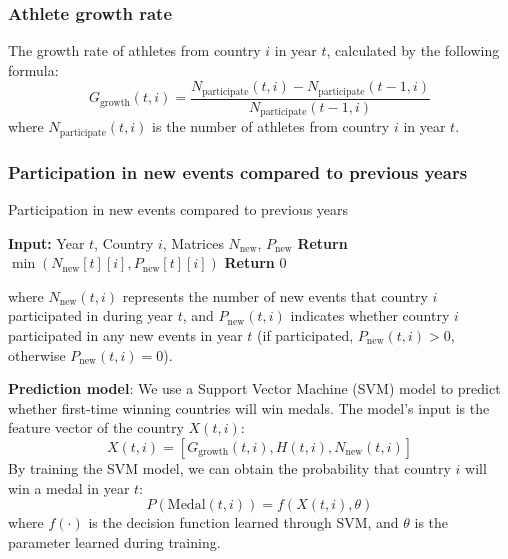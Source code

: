 \documentclass{mcmthesis}
\begin{document}
\subsubsection{Athlete growth rate}
The growth rate of athletes from country $i$ in year $t$, calculated by the following formula:
\[
G_{\text{growth}}(t,i) = \frac{N_{\text{participate}}(t,i) - N_{\text{participate}}(t-1,i)}{N_{\text{participate}}(t-1,i)}
\]
where $N_{\text{participate}}(t,i)$ is the number of athletes from country $i$ in year $t$.


\subsubsection{Participation in new events compared to previous years} 
\begin{algorithm}
	\caption{Participation in new events compared to previous years}
	\begin{algorithmic}[1]
		\State \textbf{Input:} Year \( t \), Country \( i \), Matrices \( N_{\text{new}} \), \( P_{\text{new}} \)
		\State \textbf{Return} $\min(N_{\text{new}}[t][i], P_{\text{new}}[t][i])$
		\EndIf
		\EndFor
		\State \textbf{Return} 0
	\end{algorithmic}
\end{algorithm}

where \( N_{\text{new}}(t,i) \) represents the number of new events that country \( i \) participated in during year \( t \), and \( P_{\text{new}}(t,i) \) indicates whether country \( i \) participated in any new events in year \( t \) (if participated, \( P_{\text{new}}(t,i) > 0 \), otherwise \( P_{\text{new}}(t,i) = 0 \)).





\textbf{Prediction model}:
We use a Support Vector Machine (SVM) model to predict whether first-time winning countries will win medals. The model’s input is the feature vector of the country $X(t,i)$:
\[
X(t,i) = [G_{\text{growth}}(t,i), H(t,i), N_{\text{new}}(t,i)]
\]
By training the SVM model, we can obtain the probability that country $i$ will win a medal in year $t$:
\[
P(\text{Medal}(t,i)) = f(X(t,i), \theta)
\]
where $f(\cdot)$ is the decision function learned through SVM, and $\theta$ is the parameter learned during training.
\end{document}
